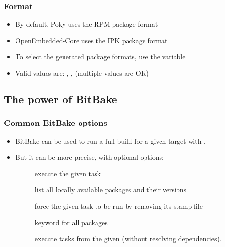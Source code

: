 \begin{frame}
  \frametitle{Format}
  \begin{itemize}
    \item By default, Poky uses the RPM package format
    \item OpenEmbedded-Core uses the IPK package format
    \item To select the generated package formats, use the
       variable
    \item Valid values are: ,
      ,  (multiple values are OK)
  \end{itemize}
\end{frame}

\subsection{The power of BitBake}

\begin{frame}
  \frametitle{Common BitBake options}
  \begin{itemize}
    \item BitBake can be used to run a full build for a given target
      with .
    \item But it can be more precise, with optional options:
    \begin{description}
      \item[] execute the given task
      \item[] list all locally available packages and their
        versions
      \item[] force the given task to be run by removing its
        stamp file
      \item[] keyword for all packages
      \item[] execute tasks from the given
         (without resolving dependencies).
    \end{description}
  \end{itemize}
\end{frame}

